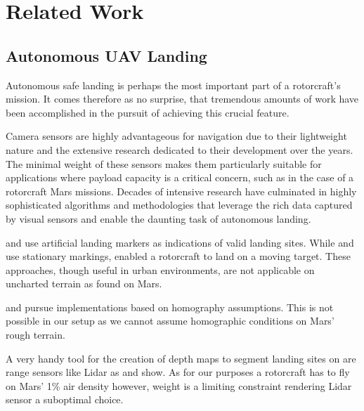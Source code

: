 \chapter{Related Work}
\label{sec:relwork}


\section{Autonomous UAV Landing}

Autonomous safe landing is perhaps the most important part of a rotorcraft's mission. It comes therefore as no surprise, that tremendous amounts of work have been accomplished in the pursuit of achieving this crucial feature. 

Camera sensors are highly advantageous for navigation due to their lightweight nature and the extensive research dedicated to their development over the years. The minimal weight of these sensors makes them particularly suitable for applications where payload capacity is a critical concern, such as in the case of a rotorcraft Mars missions. Decades of intensive research have culminated in highly sophisticated algorithms and methodologies that leverage the rich data captured by visual sensors and enable the daunting task of autonomous landing.

\citep{Saripalli2002VisionBasedLanding,Falanga2017QuadrotorLanding} and \citep{Mu2023VisionBasedLanding} use artificial landing markers as indications of valid landing sites. While \citep{Saripalli2002VisionBasedLanding} and \citep{Mu2023VisionBasedLanding} use stationary markings, \citep{Falanga2017QuadrotorLanding} enabled a rotorcraft to land on a moving target. These approaches,  though useful in urban environments,  are not applicable on uncharted terrain as found on Mars.

\citep{Bosch2006AutonomousDetection,Brockers2011AutonomousLanding,Desaraju2015VisionBased} and \citep{Brockers2014TowardsAutonomous} pursue implementations based on homography assumptions. This is not possible in our setup as we cannot assume homographic conditions on Mars' rough terrain. %

A very handy tool for the creation of depth maps to segment landing sites on are range sensors like Lidar as \citep{Trawny2015FlightTesting, Luna2017Evaluation, Johnson2002LidarBased} and \citep{Scherer2012AutonomousLanding} show. As for our purposes a rotorcraft has to fly on Mars' 1\% air density however, weight is a limiting constraint rendering Lidar sensor a suboptimal choice.

